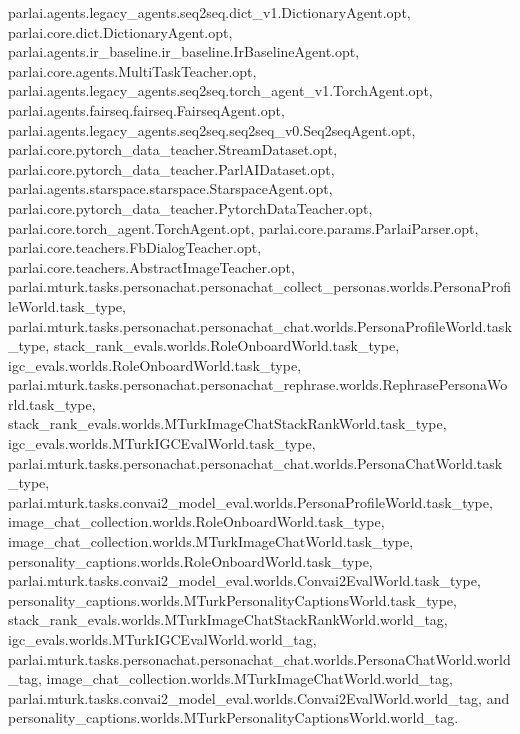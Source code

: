 parlai.\+agents.\+legacy\+\_\+agents.\+seq2seq.\+dict\+\_\+v1.\+Dictionary\+Agent.\+opt, parlai.\+core.\+dict.\+Dictionary\+Agent.\+opt, parlai.\+agents.\+ir\+\_\+baseline.\+ir\+\_\+baseline.\+Ir\+Baseline\+Agent.\+opt, parlai.\+core.\+agents.\+Multi\+Task\+Teacher.\+opt, parlai.\+agents.\+legacy\+\_\+agents.\+seq2seq.\+torch\+\_\+agent\+\_\+v1.\+Torch\+Agent.\+opt, parlai.\+agents.\+fairseq.\+fairseq.\+Fairseq\+Agent.\+opt, parlai.\+agents.\+legacy\+\_\+agents.\+seq2seq.\+seq2seq\+\_\+v0.\+Seq2seq\+Agent.\+opt, parlai.\+core.\+pytorch\+\_\+data\+\_\+teacher.\+Stream\+Dataset.\+opt, parlai.\+core.\+pytorch\+\_\+data\+\_\+teacher.\+Parl\+A\+I\+Dataset.\+opt, parlai.\+agents.\+starspace.\+starspace.\+Starspace\+Agent.\+opt, parlai.\+core.\+pytorch\+\_\+data\+\_\+teacher.\+Pytorch\+Data\+Teacher.\+opt, parlai.\+core.\+torch\+\_\+agent.\+Torch\+Agent.\+opt, parlai.\+core.\+params.\+Parlai\+Parser.\+opt, parlai.\+core.\+teachers.\+Fb\+Dialog\+Teacher.\+opt, parlai.\+core.\+teachers.\+Abstract\+Image\+Teacher.\+opt, parlai.\+mturk.\+tasks.\+personachat.\+personachat\+\_\+collect\+\_\+personas.\+worlds.\+Persona\+Profile\+World.\+task\+\_\+type, parlai.\+mturk.\+tasks.\+personachat.\+personachat\+\_\+chat.\+worlds.\+Persona\+Profile\+World.\+task\+\_\+type, stack\+\_\+rank\+\_\+evals.\+worlds.\+Role\+Onboard\+World.\+task\+\_\+type, igc\+\_\+evals.\+worlds.\+Role\+Onboard\+World.\+task\+\_\+type, parlai.\+mturk.\+tasks.\+personachat.\+personachat\+\_\+rephrase.\+worlds.\+Rephrase\+Persona\+World.\+task\+\_\+type, stack\+\_\+rank\+\_\+evals.\+worlds.\+M\+Turk\+Image\+Chat\+Stack\+Rank\+World.\+task\+\_\+type, igc\+\_\+evals.\+worlds.\+M\+Turk\+I\+G\+C\+Eval\+World.\+task\+\_\+type, parlai.\+mturk.\+tasks.\+personachat.\+personachat\+\_\+chat.\+worlds.\+Persona\+Chat\+World.\+task\+\_\+type, parlai.\+mturk.\+tasks.\+convai2\+\_\+model\+\_\+eval.\+worlds.\+Persona\+Profile\+World.\+task\+\_\+type, image\+\_\+chat\+\_\+collection.\+worlds.\+Role\+Onboard\+World.\+task\+\_\+type, image\+\_\+chat\+\_\+collection.\+worlds.\+M\+Turk\+Image\+Chat\+World.\+task\+\_\+type, personality\+\_\+captions.\+worlds.\+Role\+Onboard\+World.\+task\+\_\+type, parlai.\+mturk.\+tasks.\+convai2\+\_\+model\+\_\+eval.\+worlds.\+Convai2\+Eval\+World.\+task\+\_\+type, personality\+\_\+captions.\+worlds.\+M\+Turk\+Personality\+Captions\+World.\+task\+\_\+type, stack\+\_\+rank\+\_\+evals.\+worlds.\+M\+Turk\+Image\+Chat\+Stack\+Rank\+World.\+world\+\_\+tag, igc\+\_\+evals.\+worlds.\+M\+Turk\+I\+G\+C\+Eval\+World.\+world\+\_\+tag, parlai.\+mturk.\+tasks.\+personachat.\+personachat\+\_\+chat.\+worlds.\+Persona\+Chat\+World.\+world\+\_\+tag, image\+\_\+chat\+\_\+collection.\+worlds.\+M\+Turk\+Image\+Chat\+World.\+world\+\_\+tag, parlai.\+mturk.\+tasks.\+convai2\+\_\+model\+\_\+eval.\+worlds.\+Convai2\+Eval\+World.\+world\+\_\+tag, and personality\+\_\+captions.\+worlds.\+M\+Turk\+Personality\+Captions\+World.\+world\+\_\+tag.

